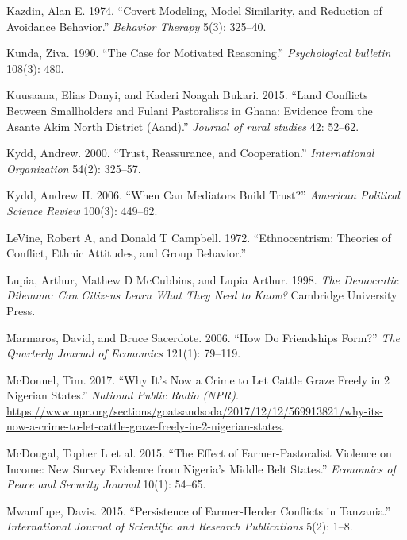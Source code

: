 \documentclass[11pt]{article}
\begin{document}
\leavevmode\hypertarget{ref-kazdin1974covertModeling}{}%
Kazdin, Alan E. 1974. ``Covert Modeling, Model Similarity, and Reduction
of Avoidance Behavior.'' \emph{Behavior Therapy} 5(3): 325--40.

\leavevmode\hypertarget{ref-kunda1990motivatedReasoning}{}%
Kunda, Ziva. 1990. ``The Case for Motivated Reasoning.''
\emph{Psychological bulletin} 108(3): 480.

\leavevmode\hypertarget{ref-kuusaana2015land}{}%
Kuusaana, Elias Danyi, and Kaderi Noagah Bukari. 2015. ``Land Conflicts
Between Smallholders and Fulani Pastoralists in Ghana: Evidence from the
Asante Akim North District (Aand).'' \emph{Journal of rural studies} 42:
52--62.

\leavevmode\hypertarget{ref-kydd2000trust}{}%
Kydd, Andrew. 2000. ``Trust, Reassurance, and Cooperation.''
\emph{International Organization} 54(2): 325--57.

\leavevmode\hypertarget{ref-kydd2006can}{}%
Kydd, Andrew H. 2006. ``When Can Mediators Build Trust?'' \emph{American
Political Science Review} 100(3): 449--62.

\leavevmode\hypertarget{ref-levine1972ethnocentrism}{}%
LeVine, Robert A, and Donald T Campbell. 1972. ``Ethnocentrism: Theories
of Conflict, Ethnic Attitudes, and Group Behavior.''

\leavevmode\hypertarget{ref-lupia1998democratic}{}%
Lupia, Arthur, Mathew D McCubbins, and Lupia Arthur. 1998. \emph{The
Democratic Dilemma: Can Citizens Learn What They Need to Know?}
Cambridge University Press.

\leavevmode\hypertarget{ref-marmaros2006friendships}{}%
Marmaros, David, and Bruce Sacerdote. 2006. ``How Do Friendships Form?''
\emph{The Quarterly Journal of Economics} 121(1): 79--119.

\leavevmode\hypertarget{ref-mcdonnel2017graze}{}%
McDonnel, Tim. 2017. ``Why It's Now a Crime to Let Cattle Graze Freely
in 2 Nigerian States.'' \emph{National Public Radio (NPR)}.
\url{https://www.npr.org/sections/goatsandsoda/2017/12/12/569913821/why-its-now-a-crime-to-let-cattle-graze-freely-in-2-nigerian-states}.

\leavevmode\hypertarget{ref-mcdougal2015effect}{}%
McDougal, Topher L et al. 2015. ``The Effect of Farmer-Pastoralist
Violence on Income: New Survey Evidence from Nigeria's Middle Belt
States.'' \emph{Economics of Peace and Security Journal} 10(1): 54--65.

\leavevmode\hypertarget{ref-mwamfupe2015persistence}{}%
Mwamfupe, Davis. 2015. ``Persistence of Farmer-Herder Conflicts in
Tanzania.'' \emph{International Journal of Scientific and Research
Publications} 5(2): 1--8.
\end{document}
